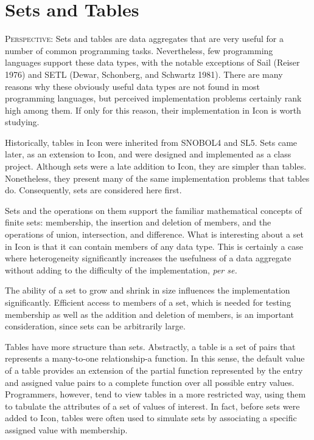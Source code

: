 \chapter{Sets and Tables}

\textsc{Perspective}: Sets and tables are data aggregates that are
very useful for a number of common programming tasks.  Nevertheless,
few programming languages support these data types, with the notable
exceptions of Sail (Reiser 1976) and SETL (Dewar, Schonberg, and
Schwartz 1981). There are many reasons why these obviously useful data
types are not found in most programming languages, but perceived
implementation problems certainly rank high among them. If only for
this reason, their implementation in Icon is worth studying.

Historically, tables in Icon were inherited from SNOBOL4 and SL5. Sets
came later, as an extension to Icon, and were designed and implemented
as a class project. Although sets were a late addition to Icon, they
are simpler than tables.  Nonetheless, they present many of the same
implementation problems that tables do. Consequently, sets are
considered here first.

Sets and the operations on them support the familiar mathematical
concepts of finite sets: membership, the insertion and deletion of
members, and the operations of union, intersection, and
difference. What is interesting about a set in Icon is that it can
contain members of any data type. This is certainly a case where
heterogeneity significantly increases the usefulness of a data
aggregate without adding to the difficulty of the implementation,
\textit{per se.}

The ability of a set to grow and shrink in size influences the
implementation significantly. Efficient access to members of a set,
which is needed for testing membership as well as the addition and
deletion of members, is an important consideration, since sets can be
arbitrarily large.


Tables have more structure than sets. Abstractly, a table is a set of
pairs that represents a many-to-one relationship-a function. In this
sense, the default value of a table provides an extension of the
partial function represented by the entry and assigned value pairs to
a complete function over all possible entry values. Programmers,
however, tend to view tables in a more restricted way, using them to
tabulate the attributes of a set of values of interest. In fact,
before sets were added to Icon, tables were often used to simulate
sets by associating a specific assigned value with membership.

